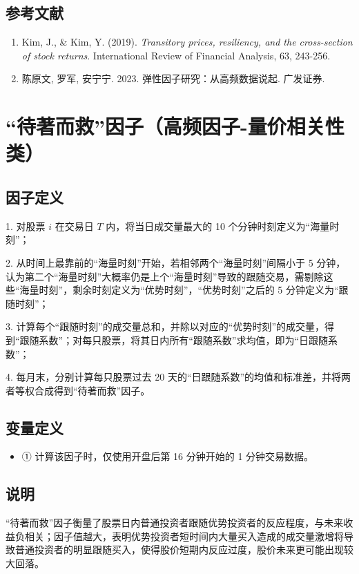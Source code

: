 \documentclass{article}
\begin{document}
\subsection{参考文献}
\begin{enumerate}
    \item Kim, J., \& Kim, Y. (2019). \textit{Transitory prices, resiliency, and the cross-section of stock returns}. International Review of Financial Analysis, 63, 243-256.
    \item 陈原文, 罗军, 安宁宁. 2023. 弹性因子研究：从高频数据说起. 广发证券.
\end{enumerate}

\section{“待著而救”因子（高频因子-量价相关性类）}

\subsection{因子定义}

1. 对股票 \( i \) 在交易日 \( T \) 内，将当日成交量最大的 10 个分钟时刻定义为“海量时刻”；

2. 从时间上最靠前的“海量时刻”开始，若相邻两个“海量时刻”间隔小于 5 分钟，认为第二个“海量时刻”大概率仍是上个“海量时刻”导致的跟随交易，需剔除这些“海量时刻”，剩余时刻定义为“优势时刻”，“优势时刻”之后的 5 分钟定义为“跟随时刻”；

3. 计算每个“跟随时刻”的成交量总和，并除以对应的“优势时刻”的成交量，得到“跟随系数”；对每只股票，将其日内所有“跟随系数”求均值，即为“日跟随系数”；

4. 每月末，分别计算每只股票过去 20 天的“日跟随系数”的均值和标准差，并将两者等权合成得到“待著而救”因子。

\subsection{变量定义}
\begin{itemize}
    \item ① 计算该因子时，仅使用开盘后第 16 分钟开始的 1 分钟交易数据。
\end{itemize}

\subsection{说明}
“待著而救”因子衡量了股票日内普通投资者跟随优势投资者的反应程度，与未来收益负相关；因子值越大，表明优势投资者短时间内大量买入造成的成交量激增将导致普通投资者的明显跟随买入，使得股价短期内反应过度，股价未来更可能出现较大回落。
\end{document}
